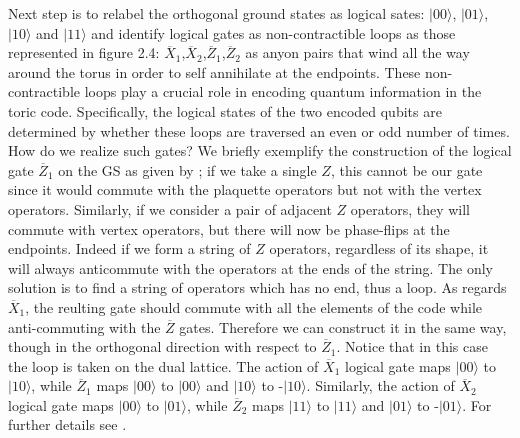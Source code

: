 \documentclass{Configuration_Files/PoliMi3i_thesis}
\begin{document}
Next step is to relabel the orthogonal ground states as logical sates: $|00\rangle$, $|01\rangle$, $|10\rangle$ and $|11\rangle$ and identify logical gates as non-contractible loops as those represented in figure 2.4: $\overline{X}_1$,$\overline{X}_2$,$\overline{Z}_1$,$\overline{Z}_2$ as anyon pairs that wind all the way around the torus in order to self annihilate at the endpoints. 
These non-contractible loops play a crucial role in encoding quantum information in the toric code. Specifically, the logical states of the two encoded qubits are determined by whether these loops are traversed an even or odd number of times. \newline
How do we realize such gates? We briefly exemplify the construction of the logical gate $\overline{Z}_1$ on the GS as given by \cite{Bro14}; if we take a single $Z$, this cannot be our gate since it would commute with the plaquette operators but not with the vertex operators. 
Similarly, if we consider a pair of adjacent $Z$ operators, they will commute with vertex operators, but there will now be phase-flips at the endpoints. Indeed if we form a string of $Z$ operators, regardless of its shape, it will always anticommute with the operators at the ends of the string. The only solution is to find a string of operators which has no end, thus a loop.\newline
As regards $\overline{X}_1$, the reulting gate should commute with all the elements of the code while anti-commuting with the $\overline{Z}$ gates. Therefore we can construct it in the same way, though in the orthogonal direction with respect to $\overline{Z}_1$. Notice that in this case the loop is taken on the dual lattice. \newline
The action of $\overline{X}_1$ logical gate maps $|00\rangle$ to $|10\rangle$, while $\overline{Z}_1$ maps $|00\rangle$ to $|00\rangle$ and $|10\rangle$ to -$|10\rangle$. Similarly, the action of $\overline{X}_2$ logical gate maps $|00\rangle$ to $|01\rangle$, while $\overline{Z}_2$ maps $|11\rangle$ to $|11\rangle$ and $|01\rangle$ to -$|01\rangle$. For further details see \cite{Her20}.\newline
\end{document}
